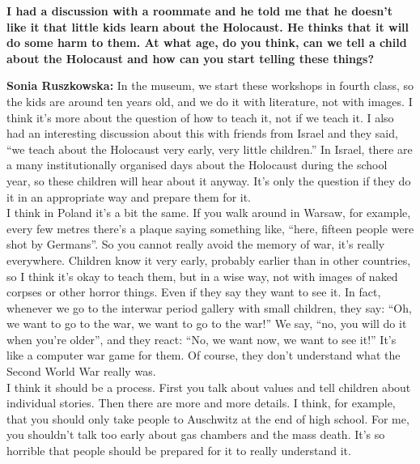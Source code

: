 \textbf{I had a discussion with a roommate and he told me that he doesn’t like it that little kids learn about the Holocaust. He thinks that it will do some harm to them. At what age, do you think, can we tell a child about the Holocaust and how can you start telling these things?} 

\textbf{Sonia Ruszkowska:} In the museum, we start these workshops in fourth class, so the kids are around ten years old, and we do it with literature, not with images. I think it’s more about the question of how to teach it, not if we teach it. I also had an interesting discussion about this with friends from Israel and they said, ``we teach about the Holocaust very early, very little children.'' In Israel, there are a many institutionally organised days about the Holocaust during the school year, so these children will hear about it anyway. It’s only the question if they do it in an appropriate way and prepare them for it.\\ 
I think in Poland it’s a bit the same. If you walk around in Warsaw, for example, every few metres there’s a plaque saying something like, ``here, fifteen people were shot by Germans''. So you cannot really avoid the memory of war, it’s really everywhere. Children know it very early, probably earlier than in other countries, so I think it’s okay to teach them, but in a wise way, not with images of naked corpses or other horror things. Even if they say they want to see it. In fact, whenever we go to the interwar period gallery with small children, they say: ``Oh, we want to go to the war, we want to go to the war!'' We say, ``no, you will do it when you’re older'', and they react: ``No, we want now, we want to see it!'' It’s like a computer war game for them. Of course, they don’t understand what the Second World War really was.\\ 
I think it should be a process. First you talk about values and tell children about individual stories. Then there are more and more details. I think, for example, that you should only take people to Auschwitz at the end of high school. For me, you shouldn’t talk too early about gas chambers and the mass death. It’s so horrible that people should be prepared for it to really understand it.  